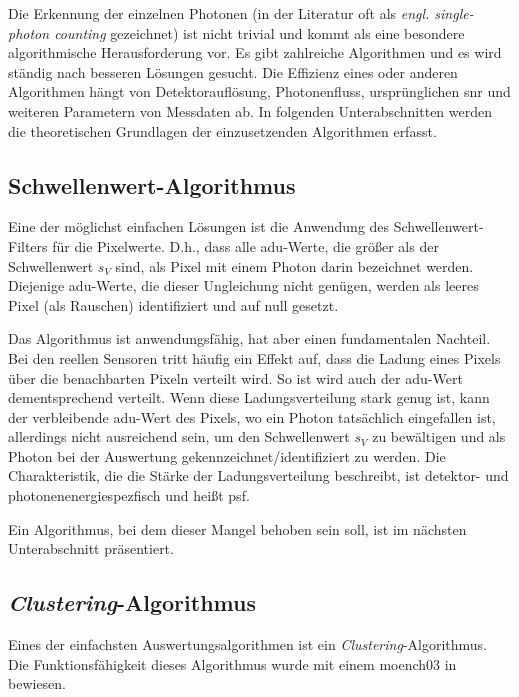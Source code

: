 \noindent
Die Erkennung der einzelnen Photonen (in der Literatur oft als \emph{engl. single-photon counting} gezeichnet) ist nicht trivial und kommt als eine besondere algorithmische Herausforderung vor. Es gibt zahlreiche Algorithmen und es wird ständig nach besseren Lösungen gesucht. Die Effizienz eines oder anderen Algorithmen hängt von Detektorauflösung, Photonenfluss, ursprünglichen \gls{snr} und weiteren Parametern von Messdaten ab. In folgenden Unterabschnitten werden die theoretischen Grundlagen der einzusetzenden Algorithmen erfasst.

\subsection{Schwellenwert-Algorithmus}
\label{text:threshold_algorithm}
Eine der möglichst einfachen Lösungen ist die Anwendung des Schwellenwert-Filters für die Pixelwerte. D.h., dass alle \gls{adu}-Werte, die größer als der Schwellenwert $s_V$ sind, als Pixel mit einem Photon darin bezeichnet werden. Diejenige \gls{adu}-Werte, die dieser Ungleichung nicht genügen, werden als leeres Pixel (als Rauschen) identifiziert und auf null gesetzt.

\noindent
Das Algorithmus ist anwendungsfähig, hat aber einen fundamentalen Nachteil. Bei den reellen Sensoren tritt häufig ein Effekt auf, dass die Ladung eines Pixels über die benachbarten Pixeln verteilt wird. So ist wird auch der \gls{adu}-Wert dementsprechend verteilt. Wenn diese Ladungsverteilung  stark genug ist, kann der verbleibende \gls{adu}-Wert des Pixels, wo ein Photon tatsächlich eingefallen ist, allerdings nicht ausreichend sein, um den Schwellenwert $s_V$ zu bewältigen und als Photon bei der Auswertung gekennzeichnet/identifiziert zu werden. Die Charakteristik, die die Stärke der Ladungsverteilung beschreibt, ist detektor- und photonenenergiespezfisch und heißt \gls{psf}.

\noindent
Ein Algorithmus, bei dem dieser Mangel behoben sein soll, ist im nächsten Unterabschnitt präsentiert.

\subsection{\emph{Clustering}-Algorithmus}
\label{text:clustering_algorithm}
Eines der einfachsten Auswertungsalgorithmen ist ein \emph{Clustering}-Algorithmus. Die Funktionsfähigkeit dieses Algorithmus wurde mit einem \gls{moench03} in \cite{cartier_micron_2014} bewiesen.

